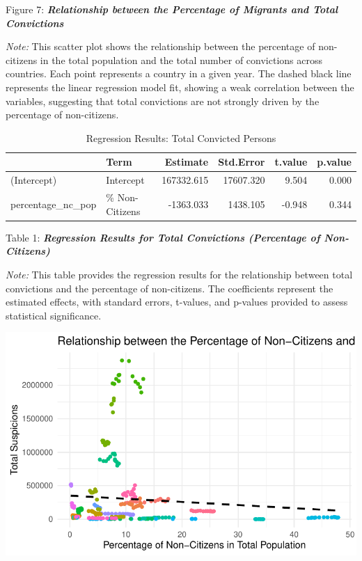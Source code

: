 \documentclass[
]{article}
\begin{document}
Figure 7: \textbf{\emph{Relationship between the Percentage of Migrants
and Total Convictions}}

\emph{Note:} This scatter plot shows the relationship between the
percentage of non-citizens in the total population and the total number
of convictions across countries. Each point represents a country in a
given year. The dashed black line represents the linear regression model
fit, showing a weak correlation between the variables, suggesting that
total convictions are not strongly driven by the percentage of
non-citizens.

\begin{table}
\centering
\caption{Regression Results: Total Convicted Persons}
\centering
\begin{tabular}[t]{l|l|r|r|r|r}
\hline
  & Term & Estimate & Std.Error & t.value & p.value\\
\hline
(Intercept) & Intercept & 167332.615 & 17607.320 & 9.504 & 0.000\\
\hline
percentage\_nc\_pop & \% Non-Citizens & -1363.033 & 1438.105 & -0.948 & 0.344\\
\hline
\end{tabular}
\end{table}

Table 1: \textbf{\emph{Regression Results for Total Convictions
(Percentage of Non-Citizens)}}

\emph{Note:} This table provides the regression results for the
relationship between total convictions and the percentage of
non-citizens. The coefficients represent the estimated effects, with
standard errors, t-values, and p-values provided to assess statistical
significance.

\includegraphics{DataMan_Project_files/figure-pdf/unnamed-chunk-33-1.pdf}
\end{document}
